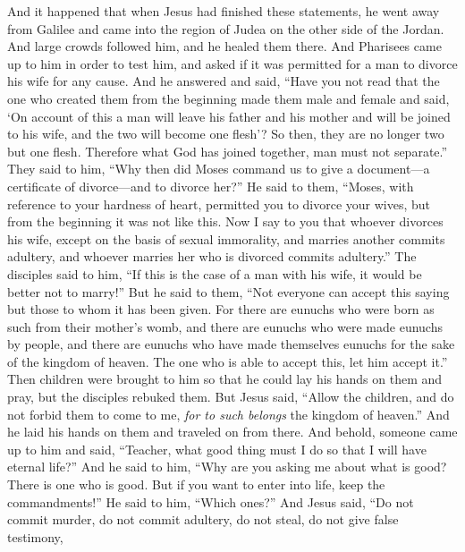\begin{biblechapter} %
 And it happened that when Jesus had finished these statements, he went away from Galilee and came into the region of Judea on the other side of the Jordan.
\verse And large crowds followed him, and he healed them there.
\verse And Pharisees came up to him in order to test him, and asked if it was permitted for a man to divorce his wife for any cause.
\verse And he answered and said, “Have you not read that the one who created them from the beginning made them male and female
\verse and said, ‘On account of this a man will leave his father and his mother and will be joined to his wife, and the two will become one flesh’?
\verse So then, they are no longer two but one flesh. Therefore what God has joined together, man must not separate.”
\verse They said to him, “Why then did Moses command us to give a document—a certificate of divorce—and to divorce her?”
\verse He said to them, “Moses, with reference to your hardness of heart, permitted you to divorce your wives, but from the beginning it was not like this.
\verse Now I say to you that whoever divorces his wife, except on the basis of sexual immorality, and marries another commits adultery, and whoever marries her who is divorced commits adultery.”
\verse The disciples said to him, “If this is the case of a man with his wife, it would be better not to marry!”
\verse But he said to them, “Not everyone can accept this saying but those to whom it has been given.
\verse For there are eunuchs who were born as such from their mother’s womb, and there are eunuchs who were made eunuchs by people, and there are eunuchs who have made themselves eunuchs for the sake of the kingdom of heaven. The one who is able to accept this, let him accept it.”
 Then children were brought to him so that he could lay his hands on them and pray, but the disciples rebuked them.
\verse But Jesus said, “Allow the children, and do not forbid them to come to me, \textit{for to such belongs} the kingdom of heaven.”
\verse And he laid his hands on them and traveled on from there.
 And behold, someone came up to him and said, “Teacher, what good thing must I do so that I will have eternal life?”
\verse And he said to him, “Why are you asking me about what is good? There is one who is good. But if you want to enter into life, keep the commandments!”
\verse He said to him, “Which ones?” And Jesus said, “Do not commit murder, do not commit adultery, do not steal, do not give false testimony,

\end{biblechapter}
